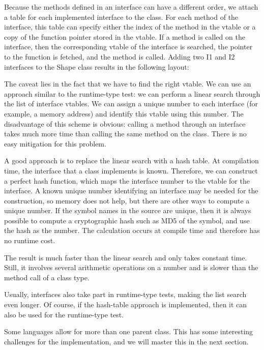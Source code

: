 Because the methods defined in an interface can have a different order, we attach a table for each implemented interface to the class. For each method of the interface, this table can specify either the index of the method in the vtable or a copy of the function pointer stored in the vtable. If a method is called on the interface, then the corresponding vtable of the interface is searched, the pointer to the function is fetched, and the method is called. Adding two I1 and I2 interfaces to the Shape class results in the following layout:


The caveat lies in the fact that we have to find the right vtable. We can use an approach similar to the runtime-type test: we can perform a linear search through the list of interface vtables. We can assign a unique number to each interface (for example, a memory address) and identify this vtable using this number. The disadvantage of this scheme is obvious: calling a method through an interface takes much more time than calling the same method on the class. There is no easy mitigation for this problem.

A good approach is to replace the linear search with a hash table. At compilation time, the interface that a class implements is known. Therefore, we can construct a perfect hash function, which maps the interface number to the vtable for the interface. A known unique number identifying an interface may be needed for the construction, so memory does not help, but there are other ways to compute a unique number. If the symbol names in the source are unique, then it is always possible to compute a cryptographic hash such as MD5 of the symbol, and use the hash as the number. The calculation occurs at compile time and therefore has no runtime cost.

The result is much faster than the linear search and only takes constant time. Still, it involves several arithmetic operations on a number and is slower than the method call of a class type.

Usually, interfaces also take part in runtime-type tests, making the list search even longer. Of course, if the hash-table approach is implemented, then it can also be used for the runtime-type test.

Some languages allow for more than one parent class. This has some interesting challenges for the implementation, and we will master this in the next section.

